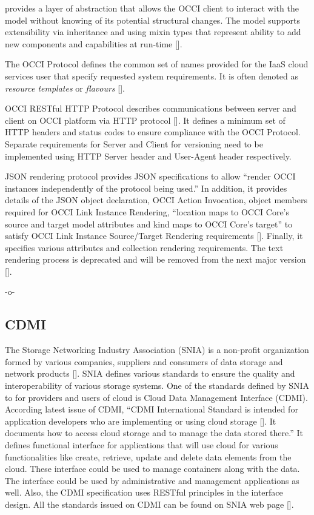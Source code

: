 provides a layer of abstraction that allows the OCCI client to
interact with the model without knowing of its potential structural
changes. The model supports extensibility via inheritance and using
mixin types that represent ability to add new components and
capabilities at run-time [\cite{nyren-edmonds-papaspyrou-2016}].

The OCCI Protocol defines the common set of names provided for the
IaaS cloud services user that specify requested system
requirements. It is often denoted as \textit{resource templates} or
\textit{flavours} [\cite{drescher-parak-wallom-2015}].

OCCI RESTful HTTP Protocol describes communications between server and
client on OCCI platform via HTTP protocol
[\cite{nyren-edmonds-metsch-2016}]. It defines a minimum set of HTTP
headers and status codes to ensure compliance with the OCCI
Protocol. Separate requirements for Server and Client for versioning
need to be implemented using HTTP Server header and User-Agent header
respectively.

JSON rendering protocol provides JSON specifications to allow ``render
OCCI instances independently of the protocol being used.'' In
addition, it provides details of the JSON object declaration, OCCI
Action Invocation, object members required for OCCI Link Instance
Rendering, ``location maps to OCCI Core's source and target model
attributes and kind maps to OCCI Core's target'' to satisfy OCCI Link
Instance Source/Target Rendering requirements
[\cite{nyren-feldhaus-parak-2016}].  Finally, it specifies various
attributes and collection rendering requirements.  The text rendering
process is deprecated and will be removed from the next major version
[\cite{edmonds-metsch-2016}].

     -o-
   
\subsection{CDMI}

The Storage Networking Industry Association (SNIA) is a non-profit
organization formed by various companies, suppliers and consumers of
data storage and network products [\cite{www-sniawebsite}]. SNIA defines
various standards to ensure the quality and interoperability of
various storage systems. One of the standards defined by SNIA to for
providers and users of cloud is Cloud Data Management Interface
(CDMI). According latest issue of CDMI, ``CDMI International Standard
is intended for application developers who are implementing or using
cloud storage [\cite{cdmi-manual}]. It documents how to access cloud
storage and to manage the data stored there.'' It defines functional
interface for applications that will use cloud for various
functionalities like create, retrieve, update and delete data elements
from the cloud. These interface could be used to manage containers
along with the data. The interface could be used by administrative and
management applications as well. Also, the CDMI specification uses
RESTful principles in the interface design. All the standards issued
on CDMI can be found on SNIA web page [\cite{www-cdmiwebsite}].


